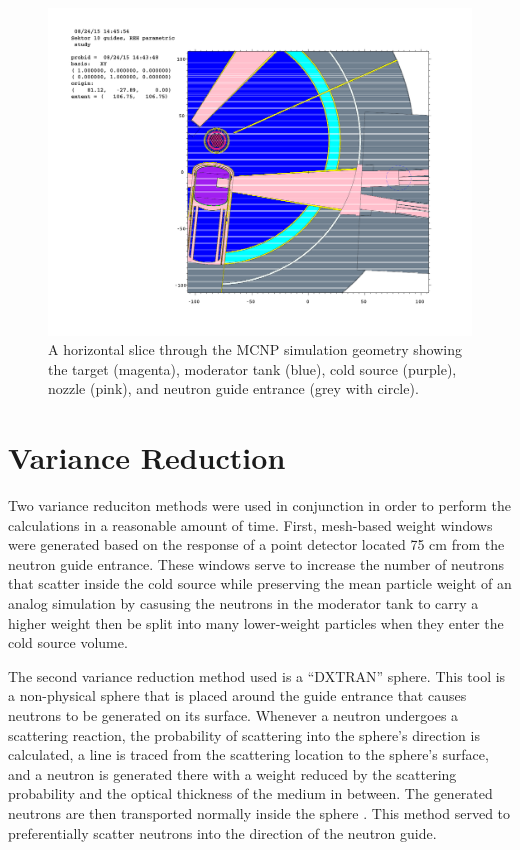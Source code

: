 \documentclass[a4paper]{jpconf}
\begin{document}
\begin{figure}
\begin{center}
\includegraphics[trim={9.2cm 8cm 4cm 8cm},clip]{graphics/geom.pdf}
\end{center}
\caption{\label{geom}A horizontal slice through the MCNP simulation geometry showing the target (magenta), moderator tank (blue), cold source (purple), nozzle (pink), and neutron guide entrance (grey with circle).}
\end{figure}

\section{Variance Reduction}

Two variance reduciton methods were used in conjunction in order to perform the calculations in a reasonable amount of time.  First, mesh-based weight windows were generated based on the response of a point detector located 75 cm from the neutron guide entrance.  These windows serve to increase the number of neutrons that scatter inside the cold source while preserving the mean particle weight of an analog simulation by casusing the neutrons in the moderator tank to carry a higher weight then be split into many lower-weight particles when they enter the cold source volume.  

The second variance reduction method used is a ``DXTRAN'' sphere.  This tool is a non-physical sphere that is placed around the guide entrance that causes neutrons to be generated on its surface.  Whenever a neutron undergoes a scattering reaction, the probability of scattering into the sphere's direction is calculated, a line is traced from the scattering location to the sphere's surface, and a neutron is generated there with a weight reduced by the scattering probability and the optical thickness of the medium in between.  The generated neutrons are then transported normally inside the sphere \cite{mcnp}.  This method served to preferentially scatter neutrons into the direction of the neutron guide.
\end{document}
